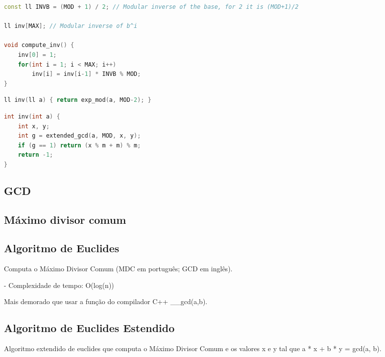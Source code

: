 \documentclass[11pt, a4paper, twoside]{article}
\begin{document}
\begin{lstlisting}[language=C++]
const ll INVB = (MOD + 1) / 2; // Modular inverse of the base, for 2 it is (MOD+1)/2

ll inv[MAX]; // Modular inverse of b^i

void compute_inv() {
    inv[0] = 1;
    for(int i = 1; i < MAX; i++)
        inv[i] = inv[i-1] * INVB % MOD;
}
\end{lstlisting}

\begin{multicols}{2}
\begin{lstlisting}[language=C++]
ll inv(ll a) { return exp_mod(a, MOD-2); }
\end{lstlisting}
\end{multicols}

\begin{multicols}{2}
\begin{lstlisting}[language=C++]
int inv(int a) {
    int x, y;
    int g = extended_gcd(a, MOD, x, y);
    if (g == 1) return (x % m + m) % m;
    return -1;
}
\end{lstlisting}
\end{multicols}

\subsection{GCD}

\subsection{Máximo divisor comum}



\subsection{Algoritmo de Euclides}


Computa o Máximo Divisor Comum (MDC em português; GCD em inglês).

- Complexidade de tempo: O(log(n))

Mais demorado que usar a função do compilador C++ \_\_gcd(a,b).

\subsection{Algoritmo de Euclides Estendido}


Algoritmo extendido de euclides que computa o Máximo Divisor Comum e os valores x e y tal que a * x + b * y = gcd(a, b).
\end{document}
